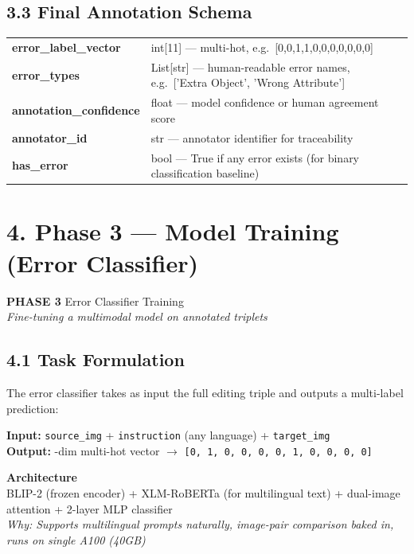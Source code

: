 \documentclass[11pt,a4paper]{article}
\begin{document}
\subsection{3.3 Final Annotation Schema}

\begin{tabularx}{\textwidth}{>{\ttfamily\bfseries}lX}
\toprule
error\_label\_vector & int[11] — multi-hot, e.g.\ [0,0,1,1,0,0,0,0,0,0,0] \\
\rowcolor{lightgray}
error\_types & List[str] — human-readable error names, e.g.\ ['Extra Object', 'Wrong Attribute'] \\
annotation\_confidence & float — model confidence or human agreement score \\
\rowcolor{lightgray}
annotator\_id & str — annotator identifier for traceability \\
has\_error & bool — True if any error exists (for binary classification baseline) \\
\bottomrule
\end{tabularx}

\section{4. Phase 3 — Model Training (Error Classifier)}

\begin{phasebox}
\textbf{PHASE 3} \quad Error Classifier Training\\
\textit{Fine-tuning a multimodal model on annotated triplets}
\end{phasebox}

\subsection{4.1 Task Formulation}

The error classifier takes as input the full editing triple and outputs a multi-label prediction:

\begin{infobox}
\textbf{Input:} \quad \texttt{source\_img} + \texttt{instruction} (any language) + \texttt{target\_img}\\[4pt]
\textbf{Output:} -dim multi-hot vector $\to$ \texttt{[0, 1, 0, 0, 0, 0, 1, 0, 0, 0, 0]}
\end{infobox}

\begin{infobox}
\textbf{Architecture}\\[4pt]
BLIP-2 (frozen encoder) + XLM-RoBERTa (for multilingual text) + dual-image attention + 2-layer MLP classifier\\[4pt]
\textit{Why: Supports multilingual prompts naturally, image-pair comparison baked in, runs on single A100 (40GB)}
\end{infobox}
\end{document}
